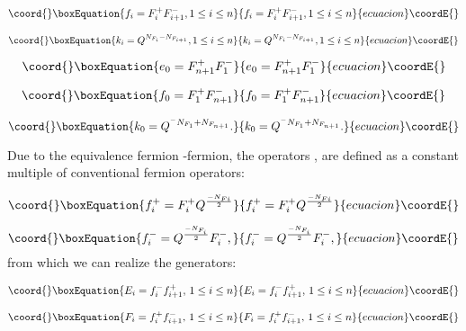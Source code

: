 \documentclass[a4paper,12pt,thmsa]{article}
\begin{document}
\begin{equation}\coord{}\boxEquation{
f_i=F_i^{+}F_{i+1}^{-},1\leq i\leq n
}{
f_i=F_i^{+}F_{i+1}^{-},1\leq i\leq n
}{ecuacion}\coordE{}\end{equation}

\begin{equation}\coord{}\boxEquation{
k_i=Q^{N_{F_i}-N_{F_{i+1}}},1\leq i\leq n
}{
k_i=Q^{N_{F_i}-N_{F_{i+1}}},1\leq i\leq n
}{ecuacion}\coordE{}\end{equation}

\begin{equation}\coord{}\boxEquation{
e_0=F_{n+1}^{+}F_1^{-}
}{
e_0=F_{n+1}^{+}F_1^{-}
}{ecuacion}\coordE{}\end{equation}

\begin{equation}\coord{}\boxEquation{
f_{0}=F_{1}^{+}F_{n+1}^{-}
}{
f_{0}=F_{1}^{+}F_{n+1}^{-}
}{ecuacion}\coordE{}\end{equation}

\begin{equation}\coord{}\boxEquation{
k_0=Q^{^{-}N_{F_1}+N_{F_{n+1}}}.
}{
k_0=Q^{^{-}N_{F_1}+N_{F_{n+1}}}.
}{ecuacion}\coordE{}\end{equation}

Due to the equivalence fermion \coordHE{}-fermion, the operators \coordHE{}, \coordHE{} are defined as a constant multiple of conventional fermion operators:

\begin{equation}\coord{}\boxEquation{
f_i^{+}=F_i^{+}Q^{\frac{-N_{Fi}}2}
}{
f_i^{+}=F_i^{+}Q^{\frac{-N_{Fi}}2}
}{ecuacion}\coordE{}\end{equation}

\begin{equation}\coord{}\boxEquation{
f_i^{-}=Q^{\frac{-N_{F_i}}2}F_i^{-},
}{
f_i^{-}=Q^{\frac{-N_{F_i}}2}F_i^{-},
}{ecuacion}\coordE{}\end{equation}
from which we can realize the generators:

\begin{equation}\coord{}\boxEquation{
E_i=f_i^{-}f_{i+1}^{+},\, 1\leq i\leq n
}{
E_i=f_i^{-}f_{i+1}^{+},\, 1\leq i\leq n
}{ecuacion}\coordE{}\end{equation}

\begin{equation}\coord{}\boxEquation{
F_i=f_i^{+}f_{i+1}^{-},\, 1\leq i\leq n
}{
F_i=f_i^{+}f_{i+1}^{-},\, 1\leq i\leq n
}{ecuacion}\coordE{}\end{equation}
\end{document}

